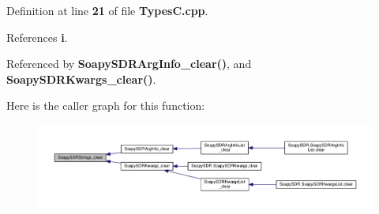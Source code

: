 Definition at line {\bf 21} of file {\bf Types\+C.\+cpp}.



References {\bf i}.



Referenced by {\bf Soapy\+S\+D\+R\+Arg\+Info\+\_\+clear()}, and {\bf Soapy\+S\+D\+R\+Kwargs\+\_\+clear()}.



Here is the caller graph for this function\+:
\nopagebreak
\begin{figure}[H]
\begin{center}
\leavevmode
\includegraphics[width=350pt]{d2/d9d/TypesC_8cpp_a10440afd7d120609fbe2eade8a4d38ee_icgraph}
\end{center}
\end{figure}


